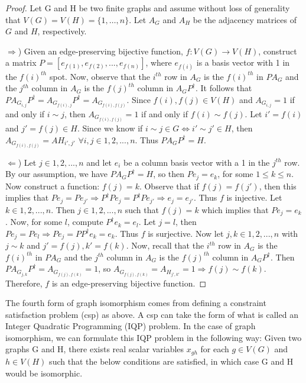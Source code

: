 \documentclass[12pt]{article}
\begin{document}
\begin{proof}
Let G and H be two finite graphs and assume without loss of generality
that $V(G)=V(H)=\{1,\ldots,n\}$. Let $A_G$ and $A_H$ be the adjacency
matrices of $G$ and $H$, respectively.

$\Rightarrow$) Given an edge-preserving bijective function, $f:V(G)
\to V(H)$, construct a matrix $P = [e_{f(1)}, e_{f(2)}, ...,
  e_{f(n)}]$, where $e_{f(i)}$ is a basis vector with 1 in the
$f(i)^{th}$ spot. Now, observe that the $i^{th}$ row in $A_G$ is the
$f(i)^{th}$ in $PA_G$ and the $j^{th}$ column in $A_G$ is the
$f(j)^{th}$ column in $A_GP^{\dag}$. It follows that $PA_{G_{i,
    j}}P^{\dag} = A_{G_{f(i), j}}P^{\dag} = A_{G_{f(i), f(j)}}$. Since
$f(i), f(j) \in V(H)$ and $A_{G_{i, j}} = 1$ if and only if $i \sim
j$, then $A_{G_{f(i), f(j)}} = 1$ if and only if $f(i) \sim f(j)$. Let
$i' = f(i)$ and $j' = f(j) \in H$. Since we know if $i \sim j \in G
\Leftrightarrow i' \sim j' \in H$, then $A_{G_{f(i), f(j)}} = A{H_{i',
    j'}}$ $\forall i, j \in 1, 2, ..., n$. Thus $PA_GP^{\dag} = H$.

$\Leftarrow$) Let $j \in 1, 2, ..., n$ and let $e_i$ be a column basis
vector with a 1 in the $j^{th}$ row. By our assumption, we have
$PA_GP^{\dag} = H$, so then $Pe_j = e_k$, for some $1 \leq k \leq
n$. Now construct a function: $f(j) = k$. Observe that if $f(j) =
f(j')$, then this implies that $Pe_j = Pe_{j'} \Rightarrow
P^{\dag}Pe_j = P^{\dag}Pe_{j'} \Rightarrow e_j = e_{j'}$. Thus $f$ is
injective. Let $k \in 1, 2, ..., n$. Then $j \in 1, 2, ..., n$ such
that $f(j) = k$ which implies that $Pe_j = e_k$. Now, for some $l$,
compute $P^{\dag}e_k = e_l$. Let $j = l$, then $Pe_j = Pe_l
\Rightarrow Pe_j = PP^{\dag}e_k = e_k$. Thus $f$ is surjective. Now
let $j, k \in 1, 2, ..., n$ with $j \sim k$ and $j' = f(j), k' =
f(k)$. Now, recall that the $i^{th}$ row in $A_G$ is the $f(i)^{th}$
in $PA_G$ and the $j^{th}$ column in $A_G$ is the $f(j)^{th}$ column
in $A_GP^{\dag}$. Then $PA_{G_{j, k}}P^{\dag} = A_{G_{f(j), f(k)}} =
1$, so $A_{G_{f(j), f(k)}} = A_{H_{j', k'}} = 1 \Rightarrow f(j) \sim
f(k)$. Therefore, $f$ is an edge-preserving bijective function.
\end{proof}

The fourth form of graph isomorphism comes from defining a constraint
satisfaction problem (csp) as above. A csp can take the form of what
is called an Integer Quadratic Programming (IQP) problem. In the case
of graph isomorphism, we can formulate this IQP problem in the
following way: Given two graphs G and H, there exists real scalar
variables $x_{gh}$ for each $g \in V(G)$ and $h \in V(H)$ such that
the below conditions are satisfied, in which case G and H would be
isomorphic.
\end{document}
